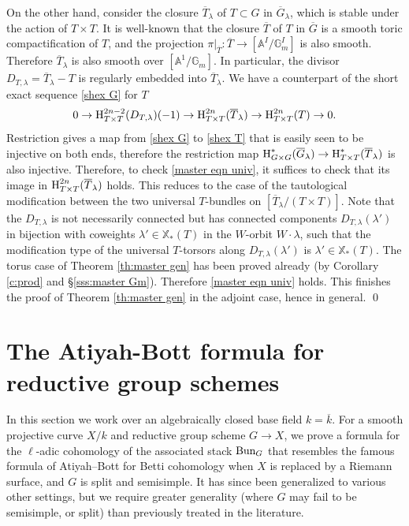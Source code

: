 \documentclass[reqno]{amsart}
\numberwithin{equation}{subsection}
\theoremstyle{definition}
\def\AA{\mathbb{A}}
\def\GG{\mathbb{G}}
\newcommand{\Bun}{\textup{Bun}}
\newcommand{\Gm}{\GG_m}
\newcommand\xcoch{\mathbb{X}_*}
\newcommand\upH{\textup{H}}
\newcommand{\ov}{\overline}
\renewcommand{\l}{\lambda}
\begin{document}
On the other hand, consider the closure $\ov T_{\l}$ of $T\subset G$ in $\ov G_{\l}$, which is stable under the action of $T\times T$. It is well-known that the closure $\ov T$ of $T$ in $\ov G$ is a smooth toric compactification of $T$, and the projection $\pi|_{\ov T}: \ov T\to [\AA^{I}/\Gm^{I}]$ is also smooth. Therefore $\ov T_{\l}$ is also smooth over $[\AA^{1}/\Gm]$. In particular, the divisor $D_{T,\l}=\ov T_{\l}-T$ is regularly embedded into $\ov T_{\l}$. We have a counterpart of the short exact sequence \eqref{shex G} for $T$
\begin{equation}\label{shex T}
0\to \upH^{2n-2}_{T\times T}(D_{T,\l})(-1)\to \upH^{2n}_{T\times T}(\ov T_{\l})\to \upH^{2n}_{T\times T}(T)\to 0.
\end{equation}
Restriction gives a map from \eqref{shex G} to \eqref{shex T} that is easily seen to be injective on both ends, therefore the restriction map $\upH^{*}_{G\times G}(\ov G_{\l})\to \upH^{*}_{T\times T}(\ov T_{\l})$ is also injective. Therefore, to check  \eqref{master eqn univ}, it suffices to check that its image in $\upH^{2n}_{T\times T}(\ov T_{\l})$ holds. This reduces to the case of the tautological modification between the two universal $T$-bundles on $[\ov T_{\l}/(T\times T)]$. Note that the $D_{T,\l}$ is not necessarily connected but has connected components $D_{T,\l}(\l')$ in bijection with coweights $\l'\in \xcoch(T)$ in the $W$-orbit $W\cdot \l$, such that the modification type of the universal $T$-torsors along $D_{T,\l}(\l')$ is $\l'\in\xcoch(T)$.  The torus case of Theorem \ref{th:master gen} has been proved already (by Corollary \ref{c:prod} and \S\ref{sss:master Gm}). Therefore \eqref{master eqn univ} holds. This finishes the proof of Theorem \ref{th:master gen} in the adjoint case, hence in general. \qed 


\section{The Atiyah-Bott formula for reductive group schemes}\label{sec: atiyah-bott}



In this section we work over an algebraically closed base field $k=\ov k$. For a smooth projective curve $X/k$ and reductive group scheme $G \rightarrow X$, we prove a formula for the $\ell$-adic cohomology of the associated stack $\Bun_G$ that resembles the famous formula of Atiyah--Bott \cite{AB83} for Betti cohomology when $X$ is replaced by a Riemann surface, and $G$ is split and semisimple. It has since been generalized to various other settings, but we require greater generality (where $G$ may fail to be semisimple, or split) than previously treated in the literature.
\end{document}
